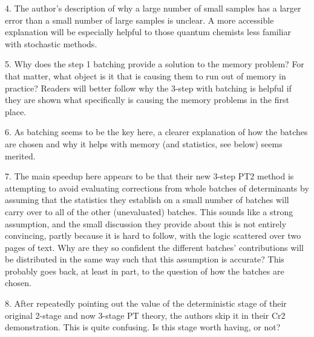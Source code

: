 \documentclass[
reprint,
 superscriptaddress,
 amsmath,amssymb,
 aps,
]{revtex4-1}
\begin{document}
{\color{blue}
4. The author's description of why a large number of small samples has a larger error than a small number of large samples is unclear. A more accessible explanation will be especially helpful to those quantum chemists less familiar with stochastic methods.
}\color{black}

{\color{blue}

5. Why does the step 1 batching provide a solution to the memory problem? For that matter, what object is it that is causing them to run out of memory in practice? Readers will better follow why the 3-step with batching is helpful if they are shown what specifically is causing the memory problems in the first place.
}\color{black}

{\color{blue}

6. As batching seems to be the key here, a clearer explanation of how the batches are chosen and why it helps with memory (and statistics, see below) seems merited.
}\color{black}

{\color{blue}

7. The main speedup here appears to be that their new 3-step PT2 method is attempting to avoid evaluating corrections from whole batches of determinants by assuming that the statistics they establish on a small number of batches will carry over to all of the other (unevaluated) batches. This sounds like a strong assumption, and the small discussion they provide about this is not entirely convincing, partly because it is hard to follow, with the logic scattered over two pages of text. Why are they so confident the different batches' contributions will be distributed in the same way such that this assumption is accurate? This probably goes back, at least in part, to the question of how the batches are chosen.
}\color{black}

{\color{blue}

8. After repeatedly pointing out the value of the deterministic stage of their original 2-stage and now 3-stage PT theory, the authors skip it in their Cr2 demonstration. This is quite confusing. Is this stage worth having, or not?
}\color{black}
\end{document}
